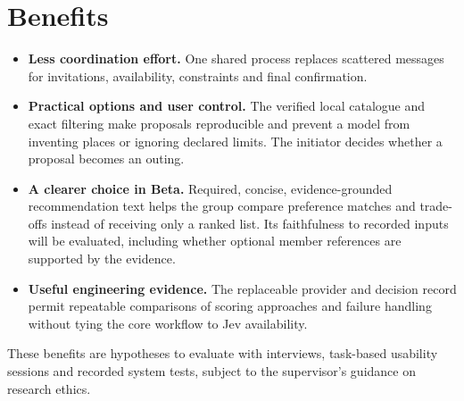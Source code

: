 \documentclass[12pt,a4paper]{article}
\begin{document}
\section*{Benefits}
\begin{itemize}
  \item \textbf{Less coordination effort.} One shared process replaces scattered messages for invitations, availability, constraints and final confirmation.
  \item \textbf{Practical options and user control.} The verified local catalogue and exact filtering make proposals reproducible and prevent a model from inventing places or ignoring declared limits. The initiator decides whether a proposal becomes an outing.
  \item \textbf{A clearer choice in Beta.} Required, concise, evidence-grounded recommendation text helps the group compare preference matches and trade-offs instead of receiving only a ranked list. Its faithfulness to recorded inputs will be evaluated, including whether optional member references are supported by the evidence.
  \item \textbf{Useful engineering evidence.} The replaceable provider and decision record permit repeatable comparisons of scoring approaches and failure handling without tying the core workflow to Jev availability.
\end{itemize}
These benefits are hypotheses to evaluate with interviews, task-based usability sessions and recorded system tests, subject to the supervisor's guidance on research ethics.
\end{document}
